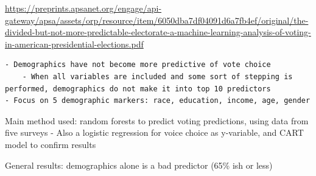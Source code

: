 \documentclass[10pt,]{article}
\begin{document}
\url{https://preprints.apsanet.org/engage/api-gateway/apsa/assets/orp/resource/item/6050dba7df04091d6a7fb4ef/original/the-divided-but-not-more-predictable-electorate-a-machine-learning-analysis-of-voting-in-american-presidential-elections.pdf}

\begin{verbatim}
- Demographics have not become more predictive of vote choice
    - When all variables are included and some sort of stepping is performed, demographics do not make it into top 10 predictors
- Focus on 5 demographic markers: race, education, income, age, gender
\end{verbatim}

Main method used: random forests to predict voting predictions, using
data from five surveys - Also a logistic regression for voice choice as
y-variable, and CART model to confirm results

General results: demographics alone is a bad predictor (65\% ish or
less)





\newpage
\singlespacing 
\end{document}
